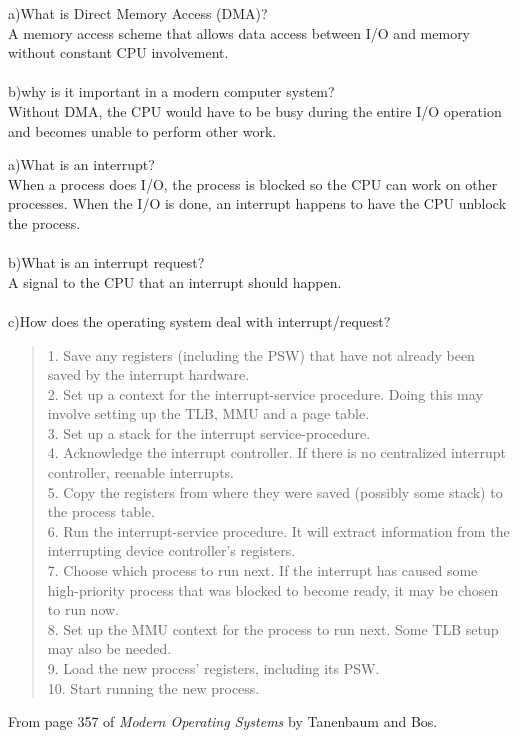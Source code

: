 \documentclass[12pt]{article}
\newenvironment{problem}[2][Problem]{\begin{trivlist}
\item[\hskip \labelsep {\bfseries #1}\hskip \labelsep {\bfseries #2.}]}{\end{trivlist}}
\begin{document}
\begin{problem}{2}
    a)What is Direct Memory Access (DMA)?\\
    A memory access scheme that allows data access between I/O and memory without constant CPU involvement.\\\\
    b)why is it important in a modern computer system?\\
    Without DMA, the CPU would have to be busy during the entire I/O operation and becomes unable to perform other work.
\end{problem}
\pagebreak
\begin{problem}{3}
    a)What is an interrupt?\\
    When a process does I/O, the process is blocked so the CPU can work on other processes. When the I/O is done, an interrupt happens to have the CPU unblock the process.\\\\
    b)What is an interrupt request?\\
    A signal to the CPU that an interrupt should happen.\\\\
    c)How does the operating system deal with interrupt/request?
\begin{quote}
1. Save any registers (including the PSW) that have not already been
saved by the interrupt hardware.\\
2. Set up a context for the interrupt-service procedure. Doing this may
involve setting up the TLB, MMU and a page table.\\
3. Set up a stack for the interrupt service-procedure.\\
4. Acknowledge the interrupt controller. If there is no centralized interrupt controller, reenable interrupts.\\
5. Copy the registers from where they were saved (possibly some stack)
to the process table.\\
6. Run the interrupt-service procedure. It will extract information from
the interrupting device controller's registers.\\
7. Choose which process to run next. If the interrupt has caused some
high-priority process that was blocked to become ready, it may be
chosen to run now.\\
8. Set up the MMU context for the process to run next. Some TLB setup may also be needed.\\
9. Load the new process' registers, including its PSW.\\
10. Start running the new process.
\end{quote}
From page 357 of \emph{Modern Operating Systems} by Tanenbaum and Bos.\cite{TanenbaumBos14}

\end{problem}
\end{document}
